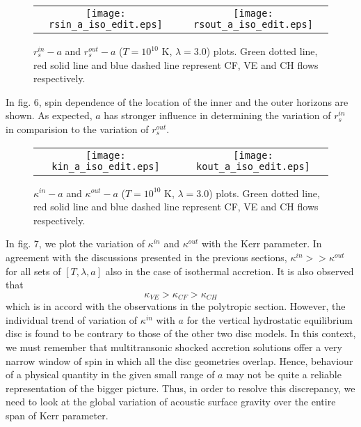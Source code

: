\documentclass[10pt,authoryear]{article}
\begin{document}
\begin{figure}[h!]
\centering
\begin{tabular}{cc}
\texttt{[image: rsin\_a\_iso\_edit.eps]} &
\texttt{[image: rsout\_a\_iso\_edit.eps]}
\end{tabular}
\caption{$r_s^{in} - a$ and $r_s^{out} - a$ ($T=10^{10}$ K, $\lambda=3.0$) plots. 
Green dotted line, red solid line and blue dashed line represent CF, VE and CH flows respectively.}
\label{fig6}
\end{figure}

In fig. 6, spin dependence 
of the location of the inner and the outer horizons are shown. As expected, $a$ has stronger influence in determining the variation of $r_s^{in}$ in 
comparision to the variation of $r_s^{out}$. \\

\begin{figure}[h!]
\centering
\begin{tabular}{cc}
\texttt{[image: kin\_a\_iso\_edit.eps]} &
\texttt{[image: kout\_a\_iso\_edit.eps]}
\end{tabular}
\caption{$\kappa^{in} - a$ and $\kappa^{out} - a$ ($T=10^{10}$ K, $\lambda=3.0$) plots. 
Green dotted line, red solid line and blue dashed line represent CF, VE and CH flows respectively.}
\label{fig7}
\end{figure}

In fig. 7, we plot the variation of $\kappa^{in}$ and $\kappa^{out}$ with the Kerr parameter. In agreement with the discussions presented in the previous 
sections, $\kappa^{in} >> \kappa^{out}$ for all sets of $\left[T,\lambda,a\right]$ also in the case of isothermal accretion. It is also observed that \\
\begin{equation}
\kappa_{VE} > \kappa_{CF} > \kappa_{CH}
\label{eqn5}
\end{equation}
which is in accord with the observations in the polytropic section. However, the individual trend of variation of $\kappa^{in}$ with $a$ for the 
vertical hydrostatic equilibrium disc is found to be contrary to those of the other two disc models. In this context, we must remember 
that multitransonic shocked accretion solutions offer a very narrow window of spin in which all the disc geometries overlap. Hence, behaviour of 
a physical quantity in the given small range of $a$ may not be quite a reliable representation of the bigger picture. Thus, in order to resolve 
this discrepancy, we need to look at the global variation of acoustic surface gravity over the entire span of Kerr parameter. 
\end{document}

